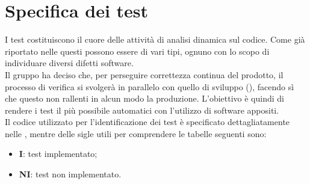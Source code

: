 \section{Specifica dei test}
I test costituiscono il cuore delle attività di analisi dinamica sul codice. Come già riportato nelle  questi possono essere di vari tipi, ognuno con lo scopo di individuare diversi difetti software. \\
Il gruppo \Gruppo{} ha deciso che, per perseguire correttezza continua del prodotto, il processo di verifica si svolgerà in parallelo con quello di sviluppo (), facendo sì che questo non rallenti in alcun modo la produzione. L'obiettivo è quindi di rendere i test il più possibile automatici con l'utilizzo di software appositi. \\
Il codice utilizzato per l'identificazione dei test è specificato dettagliatamente nelle , mentre delle sigle utili per comprendere le tabelle seguenti sono:
\begin{itemize}
	\item \textbf{I}: test implementato;
	\item \textbf{NI}: test non implementato.
\end{itemize} 






